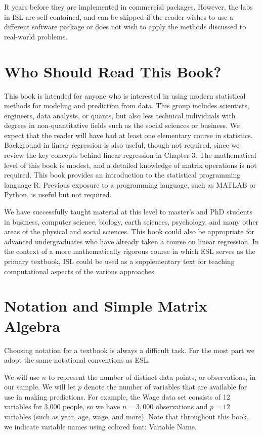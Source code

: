 \documentclass[10pt]{article}
\begin{document}
R years before they are implemented in commercial packages. However, the labs in ISL are self-contained, and can be skipped if the reader wishes to use a different software package or does not wish to apply the methods discussed to real-world problems.

\section*{Who Should Read This Book?}
This book is intended for anyone who is interested in using modern statistical methods for modeling and prediction from data. This group includes scientists, engineers, data analysts, or quants, but also less technical individuals with degrees in non-quantitative fields such as the social sciences or business. We expect that the reader will have had at least one elementary course in statistics. Background in linear regression is also useful, though not required, since we review the key concepts behind linear regression in Chapter 3. The mathematical level of this book is modest, and a detailed knowledge of matrix operations is not required. This book provides an introduction to the statistical programming language R. Previous exposure to a programming language, such as MATLAB or Python, is useful but not required.

We have successfully taught material at this level to master's and PhD students in business, computer science, biology, earth sciences, psychology, and many other areas of the physical and social sciences. This book could also be appropriate for advanced undergraduates who have already taken a course on linear regression. In the context of a more mathematically rigorous course in which ESL serves as the primary textbook, ISL could be used as a supplementary text for teaching computational aspects of the various approaches.

\section*{Notation and Simple Matrix Algebra}
Choosing notation for a textbook is always a difficult task. For the most part we adopt the same notational conventions as ESL.

We will use $n$ to represent the number of distinct data points, or observations, in our sample. We will let $p$ denote the number of variables that are available for use in making predictions. For example, the Wage data set consists of 12 variables for 3,000 people, so we have $n=3,000$ observations and $p=12$ variables (such as year, age, wage, and more). Note that throughout this book, we indicate variable names using colored font: Variable Name.
\end{document}

